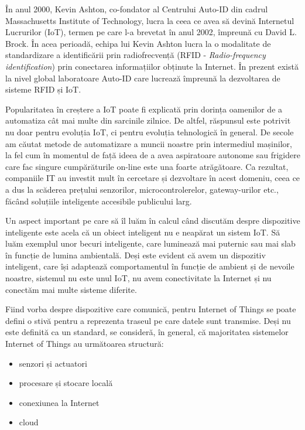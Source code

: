 În anul 2000, Kevin Ashton, co-fondator al Centrului Auto-ID din cadrul
Massachusetts Institute of Technology, lucra la ceea ce avea să devină Internetul
Lucrurilor (IoT), termen pe care l-a brevetat în anul 2002, împreună cu David L.
Brock. În acea perioadă, echipa lui Kevin Ashton lucra la o modalitate de
standardizare a identificării prin radiofrecvență (RFID - \textit{Radio-frequency identification}) prin conectarea
informațiilor obținute la Internet. În prezent există la nivel global
laboratoare Auto-ID care lucrează împreună la dezvoltarea de sisteme RFID și
IoT.

Popularitatea în creștere a IoT poate fi explicată prin dorința oamenilor de a automatiza cât
mai multe din sarcinile zilnice. De altfel, răspunsul este potrivit nu doar
pentru evoluția IoT, ci pentru evoluția tehnologică în general. De secole am
căutat metode de automatizare a muncii noastre prin intermediul mașinilor, la
fel cum în momentul de față ideea de a avea aspiratoare autonome sau frigidere
care fac singure cumpărăturile on-line este una foarte atrăgătoare. Ca rezultat,
companiile IT au investit mult în cercetare și dezvoltare în acest domeniu, ceea
ce a dus la scăderea prețului senzorilor, microcontrolerelor, gateway-urilor
etc., făcând soluțiile inteligente accesibile publicului larg.

Un aspect important pe care să îl luăm în calcul când discutăm despre
dispozitive inteligente este acela că un obiect inteligent nu e neapărat un
sistem IoT. Să luăm exemplul unor becuri inteligente, care luminează mai
puternic sau mai slab în funcție de lumina ambientală. Deși este evident că avem
un dispozitiv inteligent, care își adaptează comportamentul în funcție de
ambient și de nevoile noastre, sistemul nu este unul IoT, nu avem conectivitate
la Internet și nu conectăm mai multe sisteme diferite.

Fiind vorba despre dispozitive care comunică, pentru Internet of Things se poate
defini o stivă pentru a reprezenta traseul pe care datele sunt transmise. Deși
nu este definită ca un standard, se consideră, în general, că majoritatea
sistemelor Internet of Things au următoarea structură:

\begin{itemize}
	\item senzori și actuatori
	\item procesare și stocare locală
	\item conexiunea la Internet
	\item cloud
\end{itemize}

